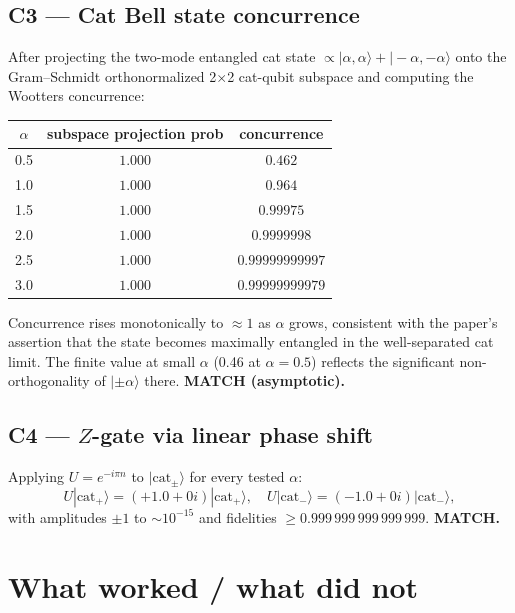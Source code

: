 \documentclass[11pt,letterpaper]{article}
\begin{document}
\subsection*{C3 --- Cat Bell state concurrence}
After projecting the two-mode entangled cat state
$\propto |\alpha,\alpha\rangle + |{-}\alpha,{-}\alpha\rangle$ onto the
Gram--Schmidt orthonormalized 2$\times$2 cat-qubit subspace and
computing the Wootters concurrence:
\begin{center}
\begin{tabular}{ccc}
\toprule
$\alpha$ & subspace projection prob & concurrence \\
\midrule
0.5 & $1.000$ & $0.462$ \\
1.0 & $1.000$ & $0.964$ \\
1.5 & $1.000$ & $0.99975$ \\
2.0 & $1.000$ & $0.9999998$ \\
2.5 & $1.000$ & $0.99999999997$ \\
3.0 & $1.000$ & $0.99999999979$ \\
\bottomrule
\end{tabular}
\end{center}
Concurrence rises monotonically to $\approx 1$ as $\alpha$ grows,
consistent with the paper's assertion that the state becomes
maximally entangled in the well-separated cat limit. The finite value
at small $\alpha$ (0.46 at $\alpha=0.5$) reflects the significant
non-orthogonality of $|{\pm}\alpha\rangle$ there. \textbf{MATCH
(asymptotic).}

\subsection*{C4 --- $Z$-gate via linear phase shift}
Applying $U = e^{-i\pi \hat n}$ to $|\text{cat}_\pm\rangle$ for every
tested $\alpha$:
\[
  U|\text{cat}_+\rangle = (+1.0 + 0i)|\text{cat}_+\rangle,\quad
  U|\text{cat}_-\rangle = (-1.0 + 0i)|\text{cat}_-\rangle,
\]
with amplitudes $\pm 1$ to $\sim 10^{-15}$ and fidelities $\ge
0.999\,999\,999\,999\,999$. \textbf{MATCH.}

\section{What worked / what did not}
\end{document}
